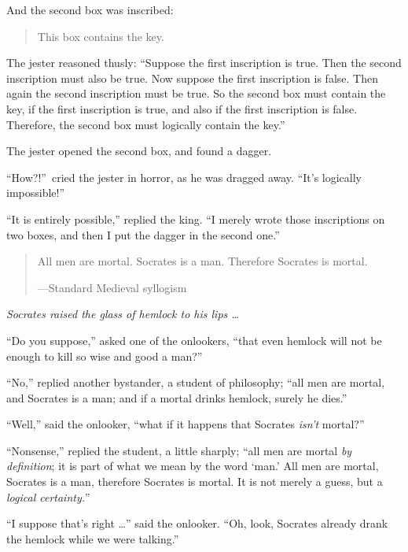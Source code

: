 {
 And the second box was inscribed:}

\begin{quote}
{
  This box contains the key.}
\end{quote}

{
 The jester reasoned thusly: ``Suppose the first
inscription is true. Then the second inscription must also be true. Now
suppose the first inscription is false. Then again the second
inscription must be true. So the second box must contain the key, if
the first inscription is true, and also if the first inscription is
false. Therefore, the second box must logically contain the
key.''}

{
 The jester opened the second box, and found a dagger.}

{
 ``How?!''~cried the jester in
horror, as he was dragged away. ``It's
logically impossible!''}

{
 ``It is entirely possible,''
replied the king. ``I merely wrote those inscriptions
on two boxes, and then I put the dagger in the second
one.''}

\myendsectiontext


\bigskip


\begin{quote}
{
 All men are mortal. Socrates is a man. Therefore Socrates is
mortal.}

{\raggedleft
 {}---Standard Medieval syllogism
\par}
\end{quote}


{
 \textit{Socrates raised the glass of hemlock to his lips \ldots}}

{
 ``Do you suppose,'' asked one
of the onlookers, ``that even hemlock will not be
enough to kill so wise and good a man?''}

{
 ``No,'' replied another
bystander, a student of philosophy; ``all men are
mortal, and Socrates is a man; and if a mortal drinks hemlock, surely
he dies.''}

{
 ``Well,'' said the onlooker,
``what if it happens that Socrates
\textit{isn't} mortal?''}

{
 ``Nonsense,'' replied the
student, a little sharply; ``all men are mortal
\textit{by definition}; it is part of what we mean by the word
`man.' All men are mortal, Socrates is a
man, therefore Socrates is mortal. It is not merely a guess, but a
\textit{logical certainty.}''}

{
 ``I suppose that's right
\ldots'' said the onlooker. ``Oh,
look, Socrates already drank the hemlock while we were
talking.''}

